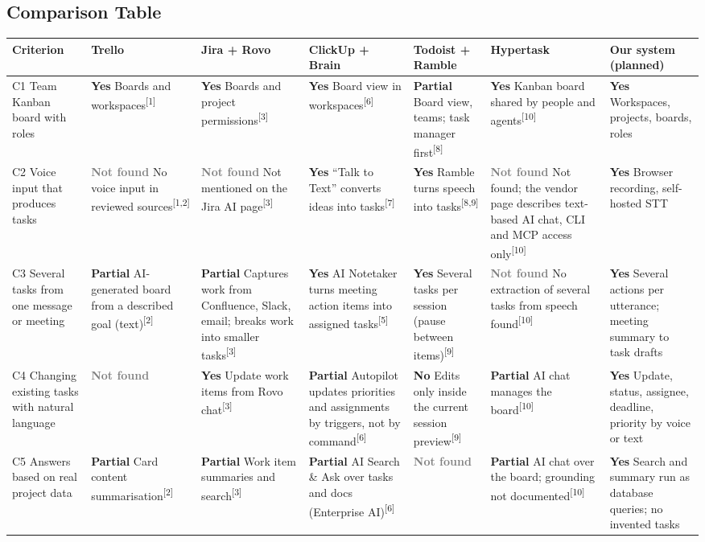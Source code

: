 \documentclass[11pt,a4paper]{article}
\newcommand{\src}[1]{\textsuperscript{[#1]}}
\newcommand{\yes}{\textcolor{green!45!black}{\textbf{Yes}}}
\newcommand{\prt}{\textcolor{orange!80!black}{\textbf{Partial}}}
\newcommand{\no}{\textcolor{red!65!black}{\textbf{No}}}
\newcommand{\nd}{\textcolor{gray}{\textbf{Not found}}}
\begin{document}
\begin{landscape}
\section{Comparison Table}

{\footnotesize{}
\setlength{\tabcolsep}{4pt}
\begin{xltabular}{\linewidth}{P{2.7cm} L L L L L L}
\toprule
\textbf{Criterion} & \textbf{Trello} & \textbf{Jira + Rovo} & \textbf{ClickUp + Brain} & \textbf{Todoist + Ramble} & \textbf{Hypertask} & \textbf{Our system (planned)} \\
\midrule
\endhead
C1 Team Kanban board with roles & \yes{} Boards and workspaces\src{1} & \yes{} Boards and project permissions\src{3} & \yes{} Board view in workspaces\src{6} & \prt{} Board view, teams; task manager first\src{8} & \yes{} Kanban board shared by people and agents\src{10} & \yes{} Workspaces, projects, boards, roles \\
C2 Voice input that produces tasks & \nd{} No voice input in reviewed sources\src{1,2} & \nd{} Not mentioned on the Jira AI page\src{3} & \yes{} ``Talk to Text'' converts ideas into tasks\src{7} & \yes{} Ramble turns speech into tasks\src{8,9} & \nd{} Not found; the vendor page describes text-based AI chat, CLI and MCP access only\src{10} & \yes{} Browser recording, self-hosted STT \\
C3 Several tasks from one message or meeting & \prt{} AI-generated board from a described goal (text)\src{2} & \prt{} Captures work from Confluence, Slack, email; breaks work into smaller tasks\src{3} & \yes{} AI Notetaker turns meeting action items into assigned tasks\src{5} & \yes{} Several tasks per session (pause between items)\src{9} & \nd{} No extraction of several tasks from speech found\src{10} & \yes{} Several actions per utterance; meeting summary to task drafts \\
C4 Changing existing tasks with natural language & \nd{} & \yes{} Update work items from Rovo chat\src{3} & \prt{} Autopilot updates priorities and assignments by triggers, not by command\src{6} & \no{} Edits only inside the current session preview\src{9} & \prt{} AI chat manages the board\src{10} & \yes{} Update, status, assignee, deadline, priority by voice or text \\
C5 Answers based on real project data & \prt{} Card content summarisation\src{2} & \prt{} Work item summaries and search\src{3} & \prt{} AI Search \& Ask over tasks and docs (Enterprise AI)\src{6} & \nd{} & \prt{} AI chat over the board; grounding not documented\src{10} & \yes{} Search and summary run as database queries; no invented tasks \\

\end{xltabular}}
\end{landscape}
\end{document}

